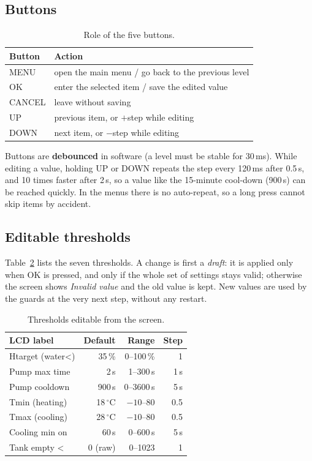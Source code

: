 \documentclass[10pt,a4paper,twocolumn]{article}
\begin{document}
\subsection{Buttons}
\begin{table}[h]
\centering\small
\caption{Role of the five buttons.}
\label{tab:buttons}
\begin{tabularx}{\columnwidth}{@{}l X@{}}
\toprule
Button & Action\\
\midrule
MENU   & open the main menu / go back to the previous level \\
OK     & enter the selected item / save the edited value \\
CANCEL & leave without saving \\
UP     & previous item, or $+$step while editing \\
DOWN   & next item, or $-$step while editing \\
\bottomrule
\end{tabularx}
\end{table}

Buttons are \textbf{debounced} in software (a level must be stable for 30\,ms). While
editing a value, holding UP or DOWN repeats the step every 120\,ms after 0.5\,s, and
10 times faster after 2\,s, so a value like the 15-minute cool-down (900\,s) can be
reached quickly. In the menus there is no auto-repeat, so a long press cannot skip
items by accident.

\subsection{Editable thresholds}
Table~\ref{tab:settings} lists the seven thresholds. A change is first a
\emph{draft}: it is applied only when OK is pressed, and only if the whole set of
settings stays valid; otherwise the screen shows \emph{Invalid value} and the old
value is kept. New values are used by the guards at the very next step, without any
restart.

\begin{table}[h]
\centering\small
\caption{Thresholds editable from the screen.}
\label{tab:settings}
\setlength{\tabcolsep}{3.5pt}
\begin{tabular}{@{}l r r r@{}}
\toprule
LCD label & Default & Range & Step\\
\midrule
Htarget (water<) & 35\,\% & 0--100\,\% & 1\\
Pump max time & 2\,s & 1--300\,s & 1\,s\\
Pump cooldown & 900\,s & 0--3600\,s & 5\,s\\
Tmin (heating) & 18\,$^\circ$C & $-10$--80 & 0.5\\
Tmax (cooling) & 28\,$^\circ$C & $-10$--80 & 0.5\\
Cooling min on & 60\,s & 0--600\,s & 5\,s\\
Tank empty < & 0 (raw) & 0--1023 & 1\\
\bottomrule
\end{tabular}
\end{table}
\end{document}
